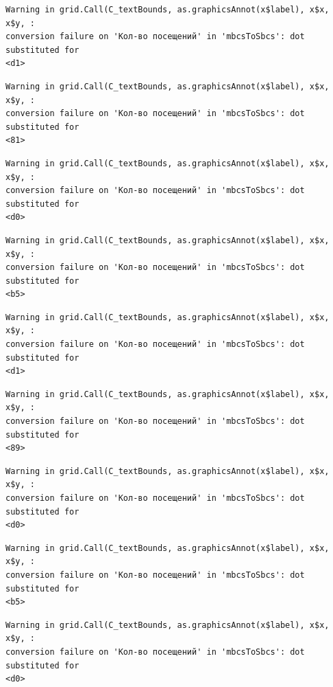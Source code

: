 \documentclass[
  letterpaper,
  DIV=11,
  numbers=noendperiod]{scrartcl}
\begin{document}
\begin{verbatim}
Warning in grid.Call(C_textBounds, as.graphicsAnnot(x$label), x$x, x$y, :
conversion failure on 'Кол-во посещений' in 'mbcsToSbcs': dot substituted for
<d1>
\end{verbatim}

\begin{verbatim}
Warning in grid.Call(C_textBounds, as.graphicsAnnot(x$label), x$x, x$y, :
conversion failure on 'Кол-во посещений' in 'mbcsToSbcs': dot substituted for
<81>
\end{verbatim}

\begin{verbatim}
Warning in grid.Call(C_textBounds, as.graphicsAnnot(x$label), x$x, x$y, :
conversion failure on 'Кол-во посещений' in 'mbcsToSbcs': dot substituted for
<d0>
\end{verbatim}

\begin{verbatim}
Warning in grid.Call(C_textBounds, as.graphicsAnnot(x$label), x$x, x$y, :
conversion failure on 'Кол-во посещений' in 'mbcsToSbcs': dot substituted for
<b5>
\end{verbatim}

\begin{verbatim}
Warning in grid.Call(C_textBounds, as.graphicsAnnot(x$label), x$x, x$y, :
conversion failure on 'Кол-во посещений' in 'mbcsToSbcs': dot substituted for
<d1>
\end{verbatim}

\begin{verbatim}
Warning in grid.Call(C_textBounds, as.graphicsAnnot(x$label), x$x, x$y, :
conversion failure on 'Кол-во посещений' in 'mbcsToSbcs': dot substituted for
<89>
\end{verbatim}

\begin{verbatim}
Warning in grid.Call(C_textBounds, as.graphicsAnnot(x$label), x$x, x$y, :
conversion failure on 'Кол-во посещений' in 'mbcsToSbcs': dot substituted for
<d0>
\end{verbatim}

\begin{verbatim}
Warning in grid.Call(C_textBounds, as.graphicsAnnot(x$label), x$x, x$y, :
conversion failure on 'Кол-во посещений' in 'mbcsToSbcs': dot substituted for
<b5>
\end{verbatim}

\begin{verbatim}
Warning in grid.Call(C_textBounds, as.graphicsAnnot(x$label), x$x, x$y, :
conversion failure on 'Кол-во посещений' in 'mbcsToSbcs': dot substituted for
<d0>
\end{verbatim}
\end{document}
